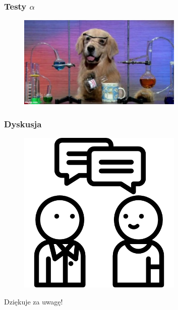 \documentclass[aspectratio=169]{beamer}
\begin{document}
\begin{frame}
	\frametitle{Testy $\alpha$} %
	\begin{figure}
		\centering
		\includegraphics[width=0.7\textwidth]{dog.jpg}
	\end{figure}
\end{frame}


\begin{frame}
	\frametitle{Dyskusja}
	\begin{figure}
		\centering
		\includegraphics[width=0.7\textwidth]{questions.png}
	\end{figure}
\end{frame}

\begin{frame}
	  \begin{center}
	\Huge Dziękuje za uwagę!
	\end{center}
\end{frame}

\end{document}
